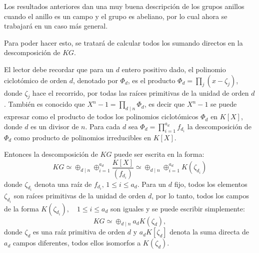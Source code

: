 Los resultados anteriores dan una muy buena descripción de los grupos anillos cuando el anillo es un campo y el grupo es abeliano, por lo cual ahora se trabajará en un caso más general. 


Para poder hacer esto, se tratará de calcular todos los sumando directos en la descomposición de $KG$.  

El lector debe recordar que para un $d$ entero positivo dado, el polinomio ciclotómico de orden $d$, denotado por $\Phi_d$, es el producto $\Phi_d = \prod_{j}(x-\zeta_j)$, donde $\zeta_j$ hace el recorrido, por todas las raíces primitivas de la unidad de orden $d$. También es conocido que $X^n -1 = \prod_{d\mid n} \Phi_d $, es decir que $X^n -1 $ se puede expresar como el producto de todos los polinomios ciclotómicos $\Phi_d$ en $K[X]$, donde $d$ es un divisor de $n$. Para cada $d$ sea $\Phi_d = \prod_{i=1}^{a_d}f_{d_i}$ la descomposición de $\Phi_d$ como producto de polinomios irreducibles en $K[X]$.

Entonces la descomposición de $KG$ puede ser escrita en la forma:
\[ KG \simeq \oplus_{d \mid n} \oplus_{i=1}^{a_d} \frac{K[X]}{(f_{d_i})} \simeq \oplus_{d \mid n} \oplus_{i=1}^{a_d} K(\zeta _{d_i}) \]
donde $\zeta_{d_i}$ denota una raíz de $f_{d_i}  \mbox{, } 1 \leq i \leq a_d $. Para un $d$ fijo, todos los elementos $\zeta_{d_i}$ son raíces primitivas de la unidad de orden $d$, por lo tanto, todos los campos de la forma $K(\zeta_{d_i}), \quad 1\leq i \leq a_d$ son iguales y se puede escribir simplemente: 
\[ KG \simeq \oplus_{d \mid n} a_dK(\zeta_d),\]
donde $\zeta_d$ es una raíz primitiva de orden $d$ y $a_dK[\zeta_d]$ denota la suma directa de $a_d$ campos diferentes, todos ellos isomorfos a $K(\zeta_d)$.

